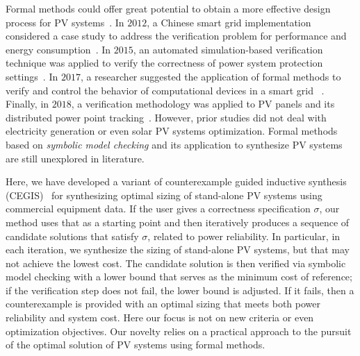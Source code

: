 \documentclass[journal]{IEEEtran}
\begin{document}
Formal methods could offer great potential to obtain a more effective design process for PV systems~\cite{ClarkeHV18}. In $2012$, a Chinese smart grid implementation considered a case study to address the verification problem for performance and energy consumption~\cite{Yukseletall2012}. In $2015$, an automated simulation-based verification technique was applied to verify the correctness of power system protection settings~\cite{Sengupta2015}. In $2017$, a researcher suggested the application of formal methods to verify and control the behavior of computational devices in a smart grid ~\cite{Abate2017}. Finally, in $2018$, a verification methodology was applied to PV panels and its distributed power point tracking~\cite{Driouich2018}. However, prior studies did not deal with electricity generation or even solar PV systems optimization. Formal methods based on \textit{symbolic model checking} and its application to synthesize PV systems are still unexplored in literature.
 
Here, we have developed a variant of counterexample guided inductive synthesis (CEGIS)~\cite{AbateCAV2018} for synthesizing optimal sizing of stand-alone PV systems using commercial equipment data. If the user gives a correctness specification $\sigma$, our method uses that as a starting point and then iteratively produces a sequence of candidate solutions that satisfy $\sigma$, related to power reliability. In particular, in each iteration, we synthesize the sizing of stand-alone PV systems, but that may not achieve the lowest cost. The candidate solution is then verified via symbolic model checking with a lower bound that serves as the minimum cost of reference; if the verification step does not fail, the lower bound is adjusted. If it fails, then a counterexample is provided with an optimal sizing that meets both power reliability and system cost. Here our focus is not on new criteria or even optimization objectives. Our novelty relies on a practical approach to the pursuit of the optimal solution of PV systems using formal methods. 
\end{document}
